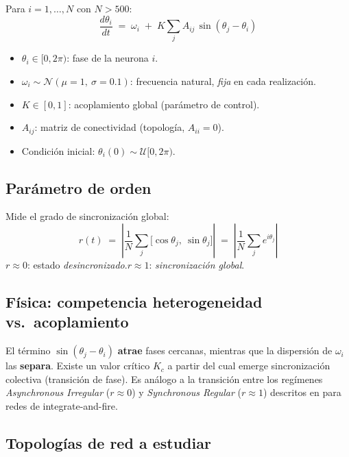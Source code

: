 \documentclass[11pt,a4paper]{article}
\begin{document}
Para $i = 1,\ldots,N$ con $N > 500$:
\begin{equation}
\frac{d\theta_i}{dt} \;=\; \omega_i \;+\; K \sum_{j} A_{ij}\, \sin(\theta_j - \theta_i)
\end{equation}

\begin{itemize}
  \item $\theta_i \in [0, 2\pi)$: fase de la neurona $i$.
  \item $\omega_i \sim \mathcal{N}(\mu=1,\ \sigma=0.1)$: frecuencia natural, \emph{fija} en cada realización.
  \item $K \in [0,1]$: acoplamiento global (parámetro de control).
  \item $A_{ij}$: matriz de conectividad (topología, $A_{ii}=0$).
  \item Condición inicial: $\theta_i(0) \sim \mathcal{U}[0, 2\pi)$.
\end{itemize}

\subsection*{Parámetro de orden}

Mide el grado de sincronización global:
\begin{equation}
r(t) \;=\; \left| \frac{1}{N} \sum_j \bigl[\cos\theta_j,\ \sin\theta_j\bigr] \right|
\;=\; \left| \frac{1}{N} \sum_j e^{i\theta_j} \right|
\end{equation}
$r \approx 0$: estado \emph{desincronizado}.\quad $r \approx 1$: \emph{sincronización global}.

\subsection*{Física: competencia heterogeneidad vs.\ acoplamiento}

El término $\sin(\theta_j - \theta_i)$ \textbf{atrae} fases cercanas, mientras que la dispersión de $\omega_i$ las \textbf{separa}. Existe un valor crítico $K_c$ a partir del cual emerge sincronización colectiva (transición de fase). Es análogo a la transición entre los regímenes \emph{Asynchronous Irregular} ($r\approx 0$) y \emph{Synchronous Regular} ($r\approx 1$) descritos en \cite{ND-Ch13} para redes de integrate-and-fire.

\subsection*{Topologías de red a estudiar}
\end{document}
